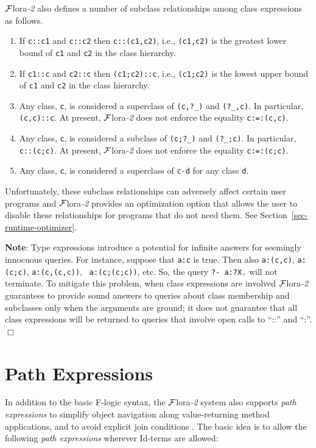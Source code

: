 \documentclass[11pt]{article}
\newcommand{\FLSYSTEM}{{\mbox{\sc ${\cal F}${lora}\rm\emph{-2}}}\xspace}
\newcommand{\fl}{\mbox{F-logic}\xspace}
\begin{document}
\FLSYSTEM also defines a number of subclass relationships among class
expressions as follows.
\begin{enumerate}
\item If {\tt c::c1} and {\tt c::c2} then {\tt c::(c1,c2)}, i.e.,
  {\tt (c1,c2)} is the greatest lower bound of {\tt c1} and {\tt c2} in the
  class hierarchy.
\item If {\tt c1::c} and {\tt c2::c} then {\tt (c1;c2)::c}, i.e.,
  {\tt (c1;c2)} is the lowest upper bound of {\tt c1} and {\tt c2} in the
  class hierarchy. 
\item Any class, {\tt c}, is considered a superclass of {\tt (c,?\_)} and
  {\tt (?\_,c)}. In particular, {\tt (c,c)::c}. At present, \FLSYSTEM does not
  enforce the equality {\tt c:=:(c,c)}.      
\item Any class, {\tt c}, is considered a subclass of {\tt (c;?\_)} and
  {\tt (?\_;c)}. In particular, {\tt c::(c;c)}. At present, \FLSYSTEM does not
  enforce the equality {\tt c:=:(c;c)}.      
\item Any class, {\tt c}, is considered a superclass of {\tt c-d} for any
  class {\tt d}.   
\end{enumerate}
Unfortunately, these subclass relationships can adversely affect certain user
programs and \FLSYSTEM provides an optimization option that allows the user to
disable these relationships for programs that do not need them. See
Section~\ref{sec-runtime-optimizer}.

\noindent
{\bf Note}: Type expressions introduce a potential for infinite answers
for seemingly innocuous queries. For instance, suppose that {\tt a:c} is
true. Then also {\tt a:(c,c)}, {\tt a:(c;c)}, {\tt a:(c,(c,c))}, {\tt
  a:(c;(c;c))}, etc. So, the query {\tt ?- a:?X.} will not terminate.
To mitigate this problem, when class expressions are involved
\FLSYSTEM guarantees to provide sound answers to queries about class
membership and subclasses only when the arguments are ground; it does
not guarantee that all class expressions will be returned to 
queries that involve open calls to ``::'' and ``:''.
\hfill$\Box$



\section{Path Expressions}\label{sec-pathexpr}


 
In addition to the basic \fl syntax, the \FLSYSTEM  system also supports
\emph{path expressions} to simplify object navigation along
value-returning method applications, and to avoid
explicit join conditions \cite{frohn-lausen-uphoff-VLDB-94}.  The
basic idea is to allow the following \emph{path expressions} wherever
Id-terms are allowed:
\end{document}
